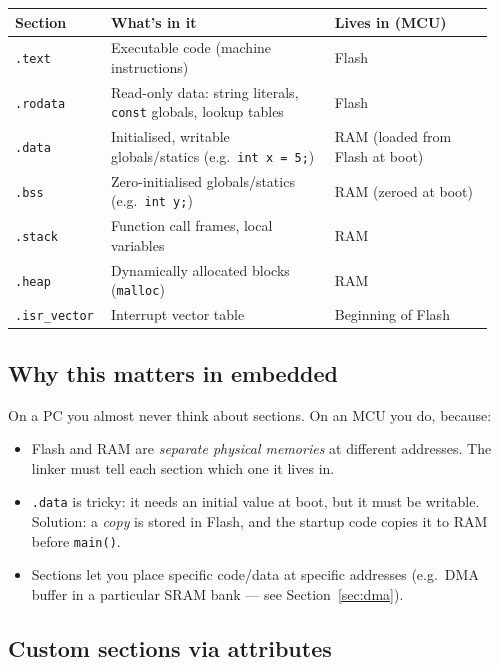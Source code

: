 \documentclass[11pt,a4paper]{article}
\begin{document}
\begin{tabular}{p{0.18\linewidth} p{0.45\linewidth} p{0.32\linewidth}}
\toprule
\textbf{Section} & \textbf{What's in it} & \textbf{Lives in (MCU)} \\
\midrule
\texttt{.text}   & Executable code (machine instructions) & Flash \\
\texttt{.rodata} & Read-only data: string literals, \texttt{const} globals, lookup tables & Flash \\
\texttt{.data}   & Initialised, writable globals/statics (e.g.\ \texttt{int x = 5;}) & RAM (loaded from Flash at boot) \\
\texttt{.bss}    & Zero-initialised globals/statics (e.g.\ \texttt{int y;}) & RAM (zeroed at boot) \\
\texttt{.stack}  & Function call frames, local variables & RAM \\
\texttt{.heap}   & Dynamically allocated blocks (\texttt{malloc}) & RAM \\
\texttt{.isr\_vector} & Interrupt vector table & Beginning of Flash \\
\bottomrule
\end{tabular}

\subsection{Why this matters in embedded}

On a PC you almost never think about sections. On an MCU you do, because:

\begin{itemize}[leftmargin=*]
    \item Flash and RAM are \emph{separate physical memories} at different
    addresses. The linker must tell each section which one it lives in.
    \item \texttt{.data} is tricky: it needs an initial value at boot,
    but it must be writable. Solution: a \emph{copy} is stored in Flash, and
    the startup code copies it to RAM before \texttt{main()}.
    \item Sections let you place specific code/data at specific addresses
    (e.g.\ DMA buffer in a particular SRAM bank --- see Section~\ref{sec:dma}).
\end{itemize}

\subsection{Custom sections via attributes}
\end{document}
